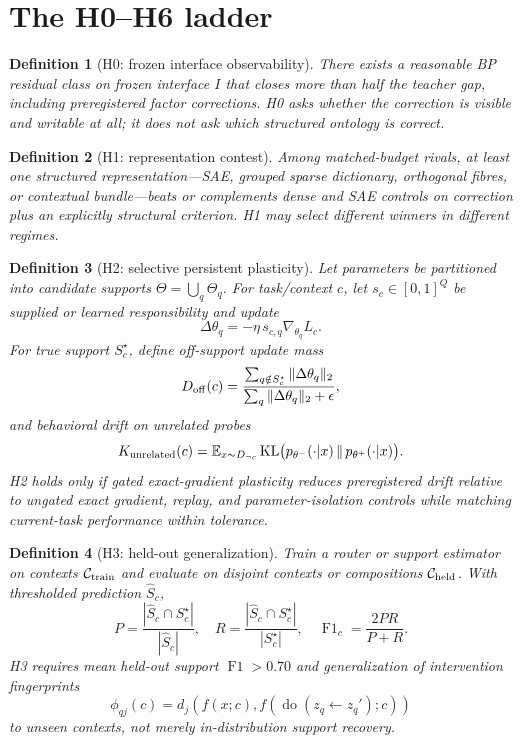 \documentclass[11pt]{article}
\newtheorem{definition}{Definition}[section]
\newcommand{\KL}{\operatorname{KL}}
\newcommand{\Fone}{\operatorname{F1}}
\begin{document}
\section{The H0--H6 ladder}

\begin{definition}[H0: frozen interface observability]
There exists a reasonable BP residual class on frozen interface $I$ that closes
more than half the teacher gap, including preregistered factor corrections.
H0 asks whether the correction is visible and writable at all; it does not ask
which structured ontology is correct.
\end{definition}

\begin{definition}[H1: representation contest]
Among matched-budget rivals, at least one structured representation---SAE,
grouped sparse dictionary, orthogonal fibres, or contextual bundle---beats or
complements dense and SAE controls on correction plus an explicitly structural
criterion.  H1 may select different winners in different regimes.
\end{definition}

\begin{definition}[H2: selective persistent plasticity]
Let parameters be partitioned into candidate supports
$\Theta=\bigcup_q\Theta_q$.  For task/context $c$, let $s_c\in[0,1]^Q$ be
supplied or learned responsibility and update
\[
 \Delta\theta_q=-\eta\,s_{c,q}\nabla_{\theta_q}L_c.
\]
For true support $S_c^\star$, define off-support update mass
\[
 D_{\rm off}(c)=
 \frac{\sum_{q\notin S_c^\star}\|\Delta\theta_q\|_2}
      {\sum_q\|\Delta\theta_q\|_2+\epsilon},
\]
and behavioral drift on unrelated probes
\[
 K_{\rm unrelated}(c)=
 \mathbb E_{x\sim D_{\neg c}}\KL
 \bigl(p_{\theta^-}(\cdot|x)\,\|\,p_{\theta^+}(\cdot|x)\bigr).
\]
H2 holds only if gated exact-gradient plasticity reduces preregistered drift
relative to ungated exact gradient, replay, and parameter-isolation controls
while matching current-task performance within tolerance.
\end{definition}

\begin{definition}[H3: held-out generalization]
Train a router or support estimator on contexts $\mathcal C_{\rm train}$ and
evaluate on disjoint contexts or compositions $\mathcal C_{\rm held}$.  With
thresholded prediction $\widehat S_c$,
\[
 P=\frac{|\widehat S_c\cap S_c^\star|}{|\widehat S_c|},\quad
 R=\frac{|\widehat S_c\cap S_c^\star|}{|S_c^\star|},\quad
 \Fone_c=\frac{2PR}{P+R}.
\]
H3 requires mean held-out support $\Fone>0.70$ and generalization of
intervention fingerprints
\[
 \phi_{qj}(c)=
 d_j\!\left(f(x;c),f(\operatorname{do}(z_q\leftarrow z_q');c)\right)
\]
to unseen contexts, not merely in-distribution support recovery.
\end{definition}
\end{document}
